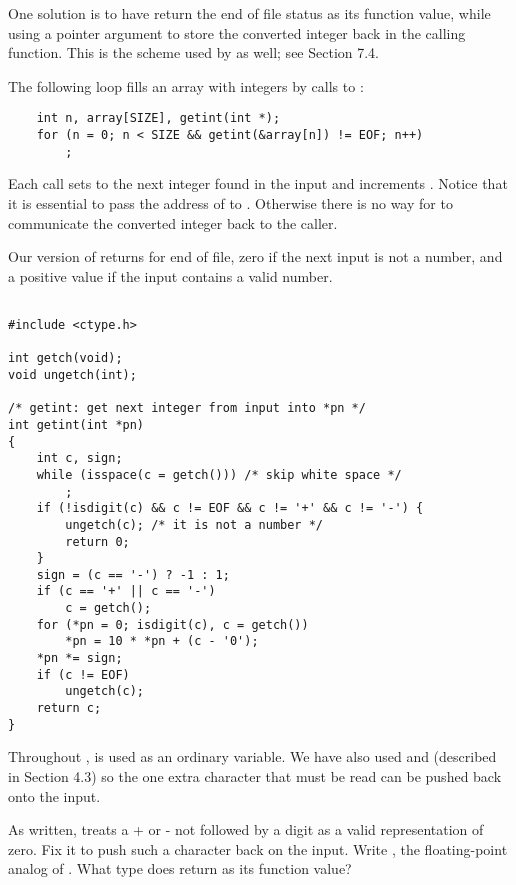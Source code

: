 One solution is to have  return the end of file status as its function value, while using a pointer argument to store the converted integer back in the calling function.
This is the scheme used by  as well; see Section 7.4.

The following loop fills an array with integers by calls to :
\begin{lstlisting}
	int n, array[SIZE], getint(int *);
	for (n = 0; n < SIZE && getint(&array[n]) != EOF; n++)
		;
\end{lstlisting}
Each call sets  to the next integer found in the input and increments .
Notice that it is essential to pass the address of  to . Otherwise there is no way for  to communicate the converted integer back to the caller.

Our version of  returns  for end of file, zero if the next input is not a number, and a positive value if the input contains a valid number.
\begin{lstlisting}

#include <ctype.h>

int getch(void);
void ungetch(int);

/* getint: get next integer from input into *pn */
int getint(int *pn)
{
	int c, sign;
	while (isspace(c = getch())) /* skip white space */
		;
	if (!isdigit(c) && c != EOF && c != '+' && c != '-') {
		ungetch(c); /* it is not a number */
		return 0;
	}
	sign = (c == '-') ? -1 : 1;
	if (c == '+' || c == '-')
		c = getch();
	for (*pn = 0; isdigit(c), c = getch())
		*pn = 10 * *pn + (c - '0');
	*pn *= sign;
	if (c != EOF)
		ungetch(c);
	return c;
}

\end{lstlisting}

Throughout ,  is used as an ordinary  variable.
We have also used  and  (described in Section 4.3) so the one extra character that must be read can be pushed back onto the input.
\newline

\begin{ExerciseList}
\Exercise As written,  treats a + or - not followed by a digit as a valid representation of zero. Fix it to push such a character back on the input.
\Exercise Write , the floating-point analog of . What type does  return as its function value?
\end{ExerciseList}

